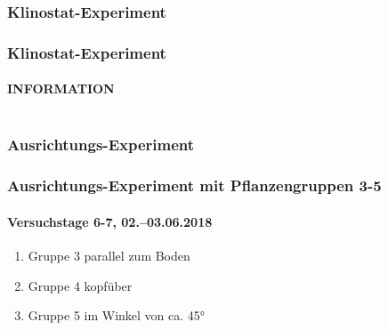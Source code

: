 \documentclass[aspectratio=169
]{beamer}
\begin{document}
\subsubsection{Klinostat-Experiment}

\begin{frame}%
\frametitle{Klinostat-Experiment}
\framesubtitle{INFORMATION}
\begin{columns}
	
\end{columns}
\end{frame}

% 		
% 	
% 
% 
% 	


\subsubsection{Ausrichtungs-Experiment}
	
\begin{frame}[<+(1)->]
\frametitle{Ausrichtungs-Experiment mit Pflanzengruppen 3-5}
\framesubtitle{Versuchstage 6-7, 02.–03.06.2018}
	
\begin{enumerate}
\item Gruppe 3 parallel zum Boden
\item Gruppe 4 kopfüber
\item Gruppe 5 im Winkel von ca. \ang{45}
\end{enumerate}
	
\end{frame}
\end{document}
